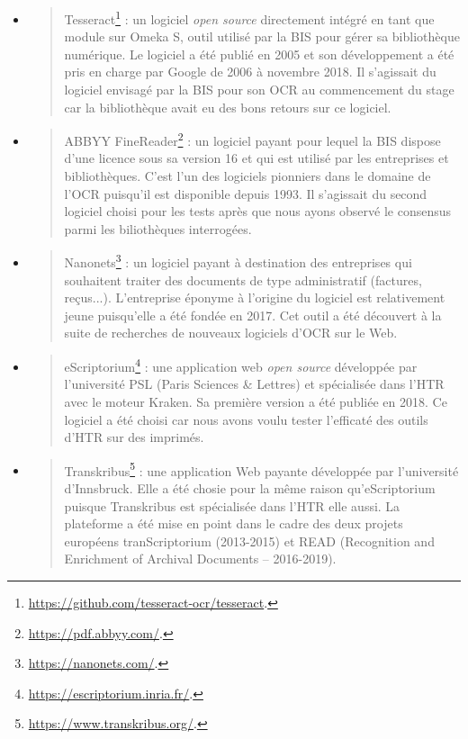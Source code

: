 \documentclass[a4paper,12pt,twoside]{book}
\begin{document}
	\begin{itemize}
		\item
		\begin{quote}
			Tesseract\footnote{\url{https://github.com/tesseract-ocr/tesseract}.}
			: un logiciel \emph{open source} directement intégré en tant que
			module sur Omeka S, outil utilisé par la BIS pour gérer sa
			bibliothèque numérique. Le logiciel a été publié en 2005 et son
			développement a été pris en charge par Google de 2006 à novembre 2018. Il s'agissait du logiciel envisagé par la BIS pour son OCR au commencement du stage car la bibliothèque avait eu des bons retours sur ce logiciel.
		\end{quote}
		\item
		\begin{quote}
			ABBYY FineReader\footnote{\url{https://pdf.abbyy.com/}.}
			: un logiciel payant pour lequel la BIS dispose d'une licence sous sa
			version 16 et qui est utilisé par les entreprises et bibliothèques.
			C'est l'un des logiciels pionniers dans le domaine de l'OCR puisqu'il
			est disponible depuis 1993. Il s'agissait du second logiciel choisi pour les tests après que nous ayons observé le consensus parmi les biliothèques interrogées.
		\end{quote}
		\item
		\begin{quote}
			Nanonets\footnote{\url{https://nanonets.com/}.}
			: un logiciel payant à destination des entreprises qui souhaitent
			traiter des documents de type administratif (factures, reçus...).
			L'entreprise éponyme à l'origine du logiciel est relativement jeune
			puisqu'elle a été fondée en 2017. Cet outil a été découvert à la suite de recherches de nouveaux logiciels d'OCR sur le Web.
		\end{quote}
		\item
		\begin{quote}
			eScriptorium\footnote{\url{https://escriptorium.inria.fr/}.}
			: une application web \emph{open source} développée par l'université
			PSL (Paris Sciences \& Lettres) et spécialisée dans l'HTR avec le
			moteur Kraken. Sa première version a été publiée en 2018. Ce logiciel a été choisi car nous avons voulu tester l'efficaté des outils d'HTR sur des imprimés.
		\end{quote}
		\item
		\begin{quote}
			Transkribus\footnote{\url{https://www.transkribus.org/}.}
			: une application Web payante développée par l'université d'Innsbruck. Elle a été chosie pour la même raison qu'eScriptorium puisque Transkribus est spécialisée dans l'HTR elle aussi. La plateforme a été mise en
			point dans le cadre des deux projets européens tranScriptorium
			(2013-2015) et READ (Recognition and Enrichment of Archival Documents
			-- 2016-2019). \\
		\end{quote}
	\end{itemize}
	
\end{document}
